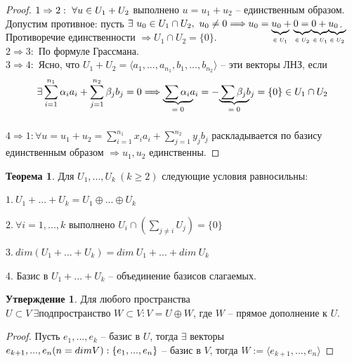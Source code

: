\documentclass[a4paper, 12pt]{article}
\newcommand\undermat[2]{\makebox[0pt][l]{$\smash{\underbrace
{\phantom{\begin{matrix}#2\end{matrix}}}_{\text{$#1$}}}$}#2}
\theoremstyle{definition}
\newtheorem*{theorem}{Теорема}
\newtheorem*{subtheorem}{Утверждение}
\begin{document}
    \begin{proof}
        $\\1 \Rightarrow 2:\ \forall u \in U_1 + U_2$ выполнено
        $u = u_1 + u_2$ -- единственным образом.
        Допустим противное: пусть $\exists\ u_0 \in U_1 \cap U_2,\ 
        u_0 \neq 0 \Longrightarrow u_0 = \mbox{\scriptsize
        \undermat{\in U_1}{\null}}u_0 + \mbox{\scriptsize
        \undermat{\in U_2}{\null}} 0 = \mbox{\scriptsize
        \undermat{\in U_1}{\null}} 0 + \mbox{\scriptsize
        \undermat{\in U_2}{\null}} u_0$.
        Противоречие единственности $\Longrightarrow U_1 \cap U_2
         = \{0\}.$\\
        $2 \Rightarrow 3:$ По формуле Грассмана.\\
        $3 \Rightarrow 4:$ Ясно, что $U_1 + U_2 =
        \langle a_1,...,a_{n_1}, b_1,..., b_{n_2} \rangle$ -- эти векторы ЛНЗ,
        если $$\exists \sum_{i=1}^{n_1}\alpha_ia_i +
        \sum_{j=1}^{n_2}\beta_jb_j = 0 \Longrightarrow
        \undermat{= 0}{\sum\alpha_ia_i} = -\undermat{=0}
        {\sum\beta_jb_j} = \{0\}\in U_1 \cap U_2$$\\
        $4 \Rightarrow 1:\forall u = u_1 + u_2 =
        \sum\limits_{i=1}^{n_1} x_ia_i + \sum\limits_{j=1}^{n_2} y_jb_j$
        раскладывается по базису единственным образом $\Rightarrow
        u_1, u_2$ единственны.
    \end{proof}
    \begin{theorem}
        Для $U_1,..., U_k\ (k \geqslant 2)$ следующие условия
        равносильны:

        $1.\ U_1+...+U_k = U_1 \oplus...\oplus U_k$

        $2.\ \forall i = 1,...,k \text{ выполнено } U_i\cap(
        \sum\limits_{j \neq i}U_j) = \{0\}$

        $3.\ dim(U_1+...+U_k) = dim\ U_1+...+dim\ U_k$

        4. Базис в $U_1+...+U_k$ -- объединение базисов слагаемых.
    \end{theorem}
    \begin{subtheorem}
        Для любого пространства $U \subset V\ \exists \text{
        подпространство } W \subset V: V = U \oplus W$,
        где $W$ -- прямое дополнение к $U$.
    \end{subtheorem}
    \begin{proof}
        Пусть $e_1,..., e_k$ -- базис в $U$, тогда $\exists$
        векторы $e_{k+1},...,e_n\\ (n = dimV): \{e_1,...,e_n\}$ --
        базис в $V$, тогда $W := \langle e_{k+1},...,e_n \rangle$
    \end{proof}
\end{document}
